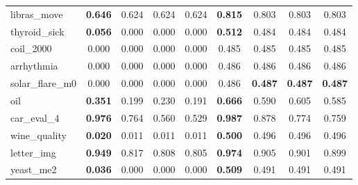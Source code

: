 \begin{figure}[ht]
\begin{tabular}{p{22mm}|*4{p{14mm}}|*4{p{14mm}}}
        libras\_move&\multicolumn{1}{c}{\textbf{0.646}}&\multicolumn{1}{c}{0.624}&\multicolumn{1}{c}{0.624}&\multicolumn{1}{c|}{0.624}&\multicolumn{1}{c}{\textbf{0.815}}&\multicolumn{1}{c}{0.803}&\multicolumn{1}{c}{0.803}&\multicolumn{1}{c}{0.803}\\
        thyroid\_sick&\multicolumn{1}{c}{\textbf{0.056}}&\multicolumn{1}{c}{0.000}&\multicolumn{1}{c}{0.000}&\multicolumn{1}{c|}{0.000}&\multicolumn{1}{c}{\textbf{0.512}}&\multicolumn{1}{c}{0.484}&\multicolumn{1}{c}{0.484}&\multicolumn{1}{c}{0.484}\\
        coil\_2000&\multicolumn{1}{c}{0.000}&\multicolumn{1}{c}{0.000}&\multicolumn{1}{c}{0.000}&\multicolumn{1}{c|}{0.000}&\multicolumn{1}{c}{0.485}&\multicolumn{1}{c}{0.485}&\multicolumn{1}{c}{0.485}&\multicolumn{1}{c}{0.485}\\
        arrhythmia&\multicolumn{1}{c}{0.000}&\multicolumn{1}{c}{0.000}&\multicolumn{1}{c}{0.000}&\multicolumn{1}{c|}{0.000}&\multicolumn{1}{c}{0.486}&\multicolumn{1}{c}{0.486}&\multicolumn{1}{c}{0.486}&\multicolumn{1}{c}{0.486}\\
        solar\_flare\_m0&\multicolumn{1}{c}{0.000}&\multicolumn{1}{c}{0.000}&\multicolumn{1}{c}{0.000}&\multicolumn{1}{c|}{0.000}&\multicolumn{1}{c}{0.486}&\multicolumn{1}{c}{\textbf{0.487}}&\multicolumn{1}{c}{\textbf{0.487}}&\multicolumn{1}{c}{\textbf{0.487}}\\
        oil&\multicolumn{1}{c}{\textbf{0.351}}&\multicolumn{1}{c}{0.199}&\multicolumn{1}{c}{0.230}&\multicolumn{1}{c|}{0.191}&\multicolumn{1}{c}{\textbf{0.666}}&\multicolumn{1}{c}{0.590}&\multicolumn{1}{c}{0.605}&\multicolumn{1}{c}{0.585}\\
        car\_eval\_4&\multicolumn{1}{c}{\textbf{0.976}}&\multicolumn{1}{c}{0.764}&\multicolumn{1}{c}{0.560}&\multicolumn{1}{c|}{0.529}&\multicolumn{1}{c}{\textbf{0.987}}&\multicolumn{1}{c}{0.878}&\multicolumn{1}{c}{0.774}&\multicolumn{1}{c}{0.759}\\
        wine\_quality&\multicolumn{1}{c}{\textbf{0.020}}&\multicolumn{1}{c}{0.011}&\multicolumn{1}{c}{0.011}&\multicolumn{1}{c|}{0.011}&\multicolumn{1}{c}{\textbf{0.500}}&\multicolumn{1}{c}{0.496}&\multicolumn{1}{c}{0.496}&\multicolumn{1}{c}{0.496}\\
        letter\_img&\multicolumn{1}{c}{\textbf{0.949}}&\multicolumn{1}{c}{0.817}&\multicolumn{1}{c}{0.808}&\multicolumn{1}{c|}{0.805}&\multicolumn{1}{c}{\textbf{0.974}}&\multicolumn{1}{c}{0.905}&\multicolumn{1}{c}{0.901}&\multicolumn{1}{c}{0.899}\\
        yeast\_me2&\multicolumn{1}{c}{\textbf{0.036}}&\multicolumn{1}{c}{0.000}&\multicolumn{1}{c}{0.000}&\multicolumn{1}{c|}{0.000}&\multicolumn{1}{c}{\textbf{0.509}}&\multicolumn{1}{c}{0.491}&\multicolumn{1}{c}{0.491}&\multicolumn{1}{c}{0.491}\\

\end{tabular}
\end{figure}
